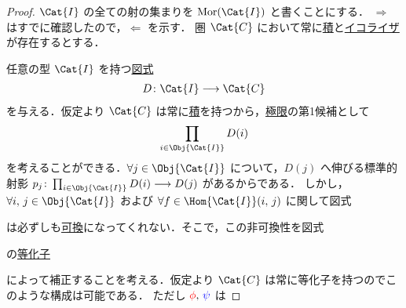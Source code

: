 \documentclass[geometry_main]{subfiles}
\begin{document}
\begin{proof}
	$\Cat{I}$ の全ての射の集まりを $\mathrm{Mor}(\Cat{I})$ と書くことにする．
	$\Longrightarrow$ はすでに確認したので，$\Longleftarrow$ を示す．
	圏 $\Cat{C}$ において常に\hyperref[def:product]{積}と\hyperref[def:equalizer]{イコライザ}が存在するとする．
	
	任意の型 $\Cat{I}$ を持つ\hyperref[def:diagram]{図式}
	\begin{align}
		D \colon \Cat{I} \lto \Cat{C}
	\end{align}
	を与える．仮定より $\Cat{C}$ は常に\hyperref[def:product]{積}を持つから，\hyperref[def:limit]{極限}の第1候補として
	\begin{align}
		\prod_{i \in \Obj{\Cat{I}}} D(i)
	\end{align}
	を考えることができる．$\forall j \in \Obj{\Cat{I}}$ について，$D(j)$ へ伸びる標準的射影 $p_j \colon \prod_{i \in \Obj{\Cat{I}}} D(i) \lto D(j)$ があるからである．
	しかし，$\forall i,\, j \in \Obj{\Cat{I}}$ および $\forall f \in \Hom{\Cat{I}}(i,\, j)$ に関して図式
	\begin{center}
	\end{center}
	は必ずしも\hyperref[def:commutative]{可換}になってくれない．そこで，この非可換性を図式
	\begin{center}
	\end{center}
	の\hyperref[def:equalizer]{等化子}
	\begin{center}
	\end{center}
	によって補正することを考える．仮定より $\Cat{C}$ は常に等化子を持つのでこのような構成は可能である．
	ただし $\textcolor{red}{\phi},\, \textcolor{blue}{\psi}$ は

\end{proof}
\end{document}
